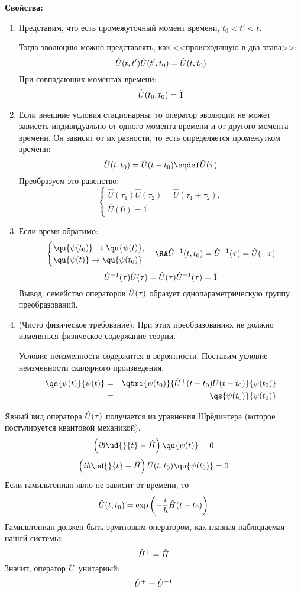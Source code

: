 \textbf{Свойства:}
\begin{enumerate}
  \item Представим, что есть промежуточный момент времени, $t_0 < t' < t$.

  Тогда эволюцию можно представлять, как <<происходящую в два этапа>>:
  $$
    \Hat U(t, t') \Hat U(t', t_0) = \Hat U(t, t_0)
  $$
  При совпадающих моментах времени:
  $$
    \Hat U(t_0, t_0) = \hat 1
  $$
  \item Если внешние условия стационарны, то оператор эволюции не может зависеть индивидуально от одного момента времени и от другого момента времени. Он зависит от их разности, то есть определяется промежутком времени:
      $$
        \hat U(t, t_0) = \Hat U(t - t_0) \eqdef \Hat U(\tau)
      $$
      Преобразуем это равенство:
      $$
      \begin{cases}
        \hat U(\tau_1) \hat U(\tau_2) = \hat U(\tau_1 + \tau_2),\\
        \hat U(0) = \hat 1
      \end{cases}
      $$
  \item Если время обратимо:
  $$
    \begin{cases}
        \qu{\psi(t_0)} \to \qu{\psi(t)},\\
        \qu{\psi(t)} \to \qu{\psi(t_0)}
    \end{cases}
    \RA
    \Hat U^{-1} (t, t_0) = \hat U^{-1} (\tau) = \hat U(-\tau)
  $$
  $$
    \Hat U^{-1} (\tau) \Hat U(\tau) = \hat U(\tau) \Hat U^{-1} (\tau) = \hat 1
  $$
  Вывод: семейство операторов $\Hat U(\tau)$ образует однопараметрическую группу преобразований.
  \item (Чисто физическое требование). При этих преобразованиях не должно изменяться физическое содержание теории.

      Условие неизменности содержится в вероятности. Поставим условие неизменности скалярного произведения.
      \begin{eqnarray*}
        \qs{\psi(t)}{\psi(t)} &=& \qtri{\psi(t_0)}{\Hat U^+ (t-t_0) \Hat U(t-t_0)}{\psi(t_0)}\\
                              &=&\qs{\psi(t_0)}{\psi(t_0)}
      \end{eqnarray*}
\end{enumerate}%
Явный вид оператора $\Hat U(\tau)$ получается из уравнения Шрёдингера (которое постулируется квантовой механикой).
$$
    \left( i\hbar \ud{}{t} - \Hat H \right) \qu{\psi(t)} = 0
$$
$$
    \left( i \hbar \ud{}{t} - \hat H \right) \hat U (t, t_0) \qu{\psi(t_0)} = 0
$$
Если гамильтониан явно не зависит от времени, то
$$
    \hat U(t, t_0) = \exp \left( -\dfrac{i}{\hbar} \Hat H (t-t_0) \right)\index{Оператор! эволюции}
$$
Гамильтониан должен быть эрмитовым оператором, как главная наблюдаемая нашей системы:
$$
    \Hat H^+ = \hat H
$$
Значит, оператор $ \Hat U$ унитарный:
$$
    \Hat U^+ = \Hat U^{-1}
$$

